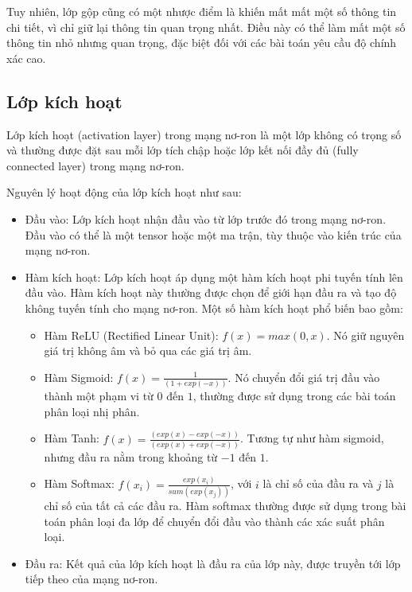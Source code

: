 Tuy nhiên, lớp gộp cũng có một nhược điểm là khiến mất mất một số thông tin chi tiết, vì chỉ giữ lại thông tin quan trọng nhất. Điều này có thể làm mất một số thông tin nhỏ nhưng quan trọng, đặc biệt đối với các bài toán yêu cầu độ chính xác cao.

\subsection{Lớp kích hoạt}
Lớp kích hoạt (activation layer) trong mạng nơ-ron là một lớp không có trọng số và thường được đặt sau mỗi lớp tích chập hoặc lớp kết nối đầy đủ (fully connected layer) trong mạng nơ-ron.

Nguyên lý hoạt động của lớp kích hoạt như sau:

\begin{itemize}
    \item Đầu vào: Lớp kích hoạt nhận đầu vào từ lớp trước đó trong mạng nơ-ron. Đầu vào có thể là một tensor hoặc một ma trận, tùy thuộc vào kiến trúc của mạng nơ-ron.
    \item Hàm kích hoạt: Lớp kích hoạt áp dụng một hàm kích hoạt phi tuyến tính lên đầu vào. Hàm kích hoạt này thường được chọn để giới hạn đầu ra và tạo độ không tuyến tính cho mạng nơ-ron. Một số hàm kích hoạt phổ biến bao gồm:
    \begin{itemize}
        \item Hàm ReLU (Rectified Linear Unit): $f(x) = max(0, x)$. Nó giữ nguyên giá trị không âm và bỏ qua các giá trị âm.
        \item Hàm Sigmoid: $f(x) = \frac{1}{(1 + exp(-x))}$. Nó chuyển đổi giá trị đầu vào thành một phạm vi từ $0$ đến $1$, thường được sử dụng trong các bài toán phân loại nhị phân.
        \item Hàm Tanh: $f(x) = \frac{(exp(x) - exp(-x))}{(exp(x) + exp(-x))}$. Tương tự như hàm sigmoid, nhưng đầu ra nằm trong khoảng từ $-1$ đến $1$.
        \item Hàm Softmax: $f(x_i) = \frac{exp(x_i)}{sum(exp(x_j))}$, với $i$ là chỉ số của đầu ra và $j$ là chỉ số của tất cả các đầu ra. Hàm softmax thường được sử dụng trong bài toán phân loại đa lớp để chuyển đổi đầu vào thành các xác suất phân loại.
    
    \end{itemize}
    \item Đầu ra: Kết quả của lớp kích hoạt là đầu ra của lớp này, được truyền tới lớp tiếp theo của mạng nơ-ron.
\end{itemize}
    
